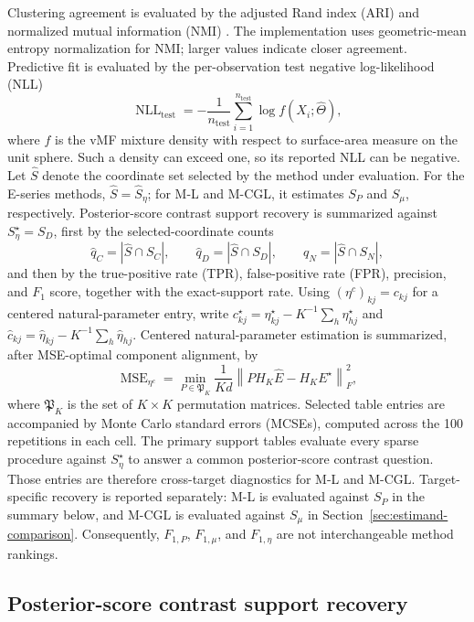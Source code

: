 \documentclass[preprint,12pt,authoryear]{elsarticle}
\begin{document}
Clustering agreement is evaluated by the adjusted Rand index (ARI)
\citep{hubert1985comparing} and normalized mutual information (NMI)
\citep{strehl2002cluster}. The implementation uses geometric-mean entropy
normalization for NMI; larger values indicate closer agreement. Predictive fit
is evaluated by the per-observation test negative log-likelihood (NLL)
\[
\operatorname{NLL}_{\mathrm{test}}
=-\frac{1}{n_{\mathrm{test}}}
\sum_{i=1}^{n_{\mathrm{test}}}
\log f(X_i;\widehat\Theta),
\]
where $f$ is the vMF mixture density with respect to surface-area measure on
the unit sphere. Such a density can exceed one, so its reported NLL can be
negative. Let $\widehat S$ denote the coordinate set selected by the method
under evaluation. For the E-series methods, $\widehat S=\widehat S_\eta$;
for M-L and M-CGL, it estimates $S_P$ and $S_\mu$, respectively.
Posterior-score contrast support recovery is summarized
against $S_\eta^\star=S_D$, first by the selected-coordinate counts
\[
\widehat q_C=|\widehat S\cap S_C|,
\qquad
\widehat q_D=|\widehat S\cap S_D|,
\qquad
\widehat q_N=|\widehat S\cap S_N|,
\]
and then by the true-positive rate (TPR), false-positive rate (FPR), precision,
and $F_1$ score, together with the exact-support rate. Using
$(\eta^c)_{kj}=c_{kj}$ for a centered natural-parameter
entry, write
$c_{kj}^{\star}=\eta_{kj}^{\star}
-K^{-1}\sum_h\eta_{hj}^{\star}$ and
$\widehat c_{kj}=\widehat\eta_{kj}
-K^{-1}\sum_h\widehat\eta_{hj}$. Centered natural-parameter estimation is
summarized, after MSE-optimal component alignment, by
\[
\operatorname{MSE}_{\eta^c}
=\min_{P\in\mathfrak P_K}
\frac{1}{Kd}
\left\lVert P H_K\widehat E-H_KE^\star\right\rVert_F^2,
\]
where $\mathfrak P_K$ is the set of $K\times K$ permutation matrices. Selected
table entries are accompanied by Monte Carlo
standard errors (MCSEs), computed across the 100 repetitions in each cell. The
primary support tables evaluate every sparse
procedure against $S_\eta^\star$ to answer a common posterior-score contrast question. Those
entries are therefore cross-target diagnostics for M-L and M-CGL.
Target-specific recovery is reported separately: M-L is evaluated against
$S_P$ in the summary below, and M-CGL is evaluated against
$S_\mu$ in Section~\ref{sec:estimand-comparison}. Consequently, $F_{1,P}$,
$F_{1,\mu}$, and $F_{1,\eta}$ are not interchangeable method rankings.

\subsection{Posterior-score contrast support recovery}
\end{document}
